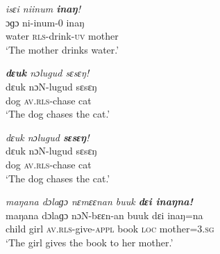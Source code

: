 {
	
	\ex
	\textit{isɛi niinum \textbf{inaŋ}!} \\
	\gll   ɔɡɔ ni-inum-0 inaŋ\\
	water \textsc{rls-}drink\textsc{-uv} mother\\
	\glt `The mother drinks water.' 
}


\z
\z



\ea
\label{appendix-Focus Question 5}

{
	
	\ex
	\textit{\textbf{dɛuk} nɔlugud sɛsɛŋ!} \\
	\gll   dɛuk nɔN-lugud sɛsɛŋ\\
	dog \textsc{av.rls-}chase cat\\
	\glt `The dog chases the cat.' 
}


\z
\z

\ea
\label{appendix-Focus Question 6}

{
	
	\ex
	\textit{dɛuk nɔlugud \textbf{sɛsɛŋ}!} \\
	\gll   dɛuk nɔN-lugud sɛsɛŋ\\
	dog \textsc{av.rls-}chase cat\\
	\glt `The dog chases the cat.' 
}


\z
\z

\ea
\label{appendix-Focus Question 7}

{
	
	\ex
	\textit{maŋana dɔlaɡɔ nɛmɛɛnan buuk \textbf{dɛi inaŋna!}} \\
	\gll   maŋana dɔlaɡɔ nɔN-bɛɛn-an buuk dɛi inaŋ=na\\
	child girl \textsc{av.rls-}give-\textsc{appl} book \textsc{loc} mother\textsc{=3.sg}\\
	\glt `The girl gives the book to her mother.' 
}


